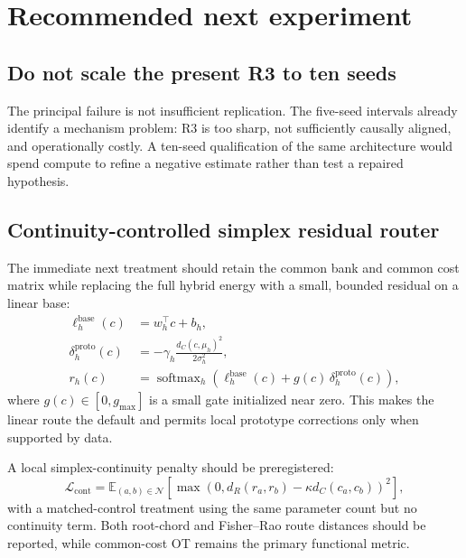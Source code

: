 \documentclass[11pt,a4paper]{article}
\newcommand{\E}{\mathbb{E}}
\newcommand{\loss}{\mathcal{L}}
\newcommand{\softmax}{\operatorname{softmax}}
\begin{document}
\section{Recommended next experiment}
\subsection{Do not scale the present R3 to ten seeds}
The principal failure is not insufficient replication. The five-seed intervals already identify a mechanism problem: R3 is too sharp, not sufficiently causally aligned, and operationally costly. A ten-seed qualification of the same architecture would spend compute to refine a negative estimate rather than test a repaired hypothesis.

\subsection{Continuity-controlled simplex residual router}
The immediate next treatment should retain the common bank and common cost matrix while replacing the full hybrid energy with a small, bounded residual on a linear base:
\begin{align}
 \ell_h^{\mathrm{base}}(c)&=w_h^\top c+b_h,\\
 \delta_h^{\mathrm{proto}}(c)&=-\gamma_h\frac{d_C(c,\mu_h)^2}{2\sigma_h^2},\\
 r_h(c)&=\softmax_h\!\left(\ell_h^{\mathrm{base}}(c)+g(c)\,\delta_h^{\mathrm{proto}}(c)\right),
\end{align}
where $g(c)\in[0,g_{\max}]$ is a small gate initialized near zero. This makes the linear route the default and permits local prototype corrections only when supported by data.

A local simplex-continuity penalty should be preregistered:
\begin{equation}
 \loss_{\mathrm{cont}}=
 \E_{(a,b)\in\mathcal N}
 \left[\max\left(0,
 d_R(r_a,r_b)-\kappa d_C(c_a,c_b)
 \right)^2\right],
\end{equation}
with a matched-control treatment using the same parameter count but no continuity term. Both root-chord and Fisher--Rao route distances should be reported, while common-cost OT remains the primary functional metric.
\end{document}

